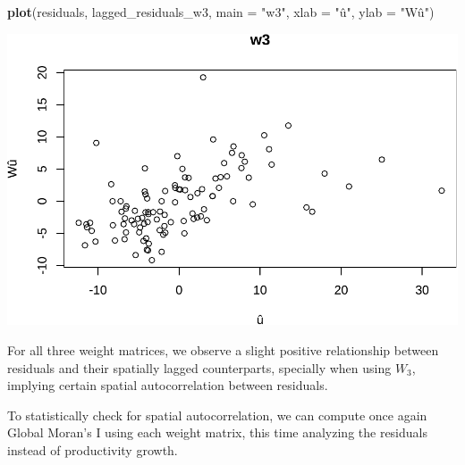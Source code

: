 \documentclass[
  a4paper,
]{article}
\newenvironment{Shaded}{\begin{snugshade}}{\end{snugshade}}
\newcommand{\AttributeTok}[1]{\textcolor[rgb]{0.13,0.29,0.53}{#1}}
\newcommand{\FunctionTok}[1]{\textcolor[rgb]{0.13,0.29,0.53}{\textbf{#1}}}
\newcommand{\NormalTok}[1]{#1}
\newcommand{\OtherTok}[1]{\textcolor[rgb]{0.56,0.35,0.01}{#1}}
\newcommand{\SpecialCharTok}[1]{\textcolor[rgb]{0.81,0.36,0.00}{\textbf{#1}}}
\newcommand{\StringTok}[1]{\textcolor[rgb]{0.31,0.60,0.02}{#1}}
\begin{document}
\begin{Shaded}
\begin{Highlighting}[]
\FunctionTok{plot}\NormalTok{(residuals, lagged\_residuals\_w3, }\AttributeTok{main =} \StringTok{"w3"}\NormalTok{, }\AttributeTok{xlab =} \StringTok{"û"}\NormalTok{, }\AttributeTok{ylab =} \StringTok{"Wû"}\NormalTok{)}
\end{Highlighting}
\end{Shaded}

\includegraphics{assignment2_files/figure-latex/unnamed-chunk-14-3.pdf}

For all three weight matrices, we observe a slight positive relationship
between residuals and their spatially lagged counterparts, specially
when using \(W_3\), implying certain spatial autocorrelation between
residuals.

To statistically check for spatial autocorrelation, we can compute once
again Global Moran's I using each weight matrix, this time analyzing the
residuals instead of productivity growth.

\begin{Shaded}
\end{Shaded}
\end{document}
